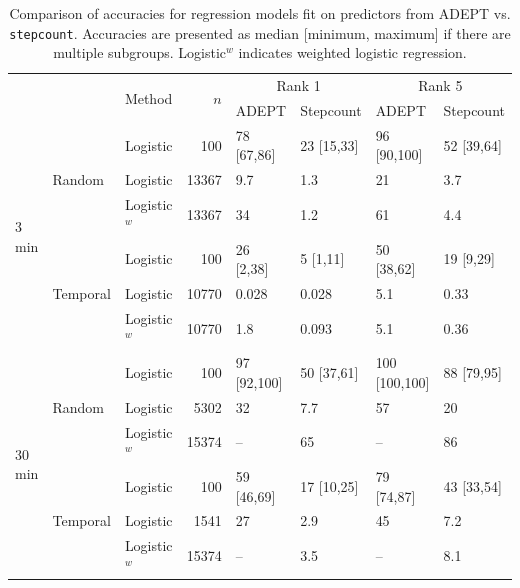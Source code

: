 \begin{table}[H]
\small
\begin{tabular}[t]{lllrllll}
\toprule
 & &\multirow{2}{*}{Method}  & \multirow{2}{*}{$n$} & \multicolumn{2}{c}{Rank 1} & \multicolumn{2}{c}{Rank 5} \\
& & & & ADEPT & Stepcount & ADEPT & Stepcount \\
\midrule
\multirow{6}{*}{3 min} & 
\multirow{3}{*}{Random} & Logistic & 100 & 78 [67,86] & 23  [15,33] & 96 [90,100] & 52 [39,64]\\
& &Logistic & 13367 & 9.7  & 1.3  & 21  & 3.7 \\
&& Logistic$^w$ & 13367 & 34 & 1.2 & 61  & 4.4 \\
\cmidrule{2-8}
&\multirow{3}{*}{Temporal} & Logistic & 100 & 26 [2,38] & 5 [1,11] & 50 [38,62] & 19 [9,29]\\
&& Logistic & 10770 & 0.028 & 0.028  & 5.1 & 0.33 \\
&& Logistic$^w$ & 10770 & 1.8  & 0.093  & 5.1  & 0.36 \\
\midrule \midrule 
\multirow{6}{*}{30 min} & \multirow{3}{*}{Random} & Logistic & 100 & 97 [92,100] & 50 [37,61] & 100 [100,100] & 88 [79,95]\\
&& Logistic & 5302 & 32 & 7.7  & 57 & 20 \\
&& Logistic$^w$ & 15374 & -- & 65 & --  & 86 \\
\cmidrule{2-8}
&\multirow{3}{*}{Temporal} & Logistic & 100  & 59 [46,69] & 17 [10,25] & 79 [74,87] & 43 [33,54]\\
&& Logistic & 1541 & 27 & 2.9 & 45& 7.2 \\
&& Logistic$^w$ & 15374 & -- & 3.5 & --  & 8.1 \\
\bottomrule
\end{tabular}
\caption{Comparison of accuracies for regression models fit on predictors from ADEPT vs. \texttt{stepcount}. Accuracies are presented as median [minimum, maximum] if there are multiple subgroups. Logistic$^w$ indicates weighted logistic regression.}
\label{tab:scvadept}
\end{table} 






